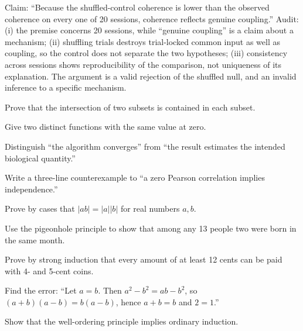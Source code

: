 \begin{workedexample}
Claim: ``Because the shuffled-control coherence is lower than the observed coherence on every one of 20 sessions, coherence reflects genuine coupling.'' Audit: (i) the premise concerns 20 sessions, while ``genuine coupling'' is a claim about a mechanism; (ii) shuffling trials destroys trial-locked common input as well as coupling, so the control does not separate the two hypotheses; (iii) consistency across sessions shows reproducibility of the comparison, not uniqueness of its explanation. The argument is a valid rejection of the shuffled null, and an invalid inference to a specific mechanism.
\end{workedexample}
\begin{exercises}
\item Prove that the intersection of two subsets is contained in each subset.
\item Give two distinct functions with the same value at zero.
\item Distinguish ``the algorithm converges'' from ``the result estimates the intended biological quantity.''
\item Write a three-line counterexample to ``a zero Pearson correlation implies independence.''
\item Prove by cases that $|ab|=|a||b|$ for real numbers $a,b$.
\item Use the pigeonhole principle to show that among any 13 people two were born in the same month.
\item Prove by strong induction that every amount of at least 12 cents can be paid with 4- and 5-cent coins.
\item Find the error: ``Let $a=b$. Then $a^2-b^2=ab-b^2$, so $(a+b)(a-b)=b(a-b)$, hence $a+b=b$ and $2=1$.''
\item Show that the well-ordering principle implies ordinary induction.
\end{exercises}
